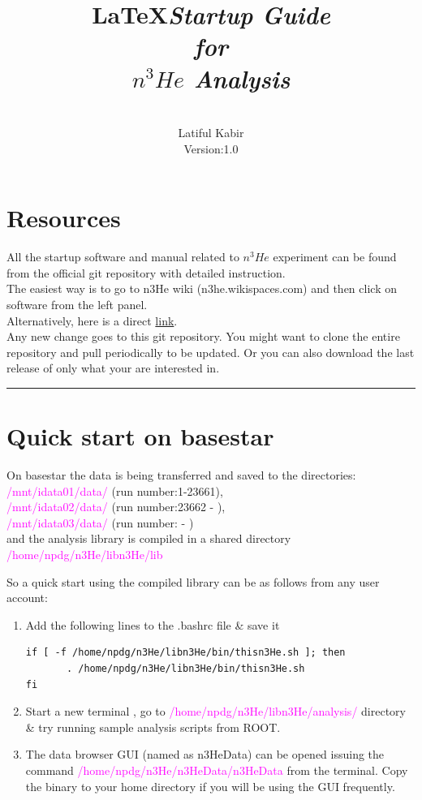 \documentclass[12pt]{article}
\title{\LaTeX}
\date{}
\title{\emph{\huge\textbf{Startup Guide \\ for \\$n^3He$ Analysis}}
}
\author{\\Latiful Kabir\\
Version:1.0
}
\begin{document}
  \maketitle
  
\newpage  
\tableofcontents
\newpage
\setcounter{tocdepth}{2}

\section{Resources}
All the startup software and manual related to $n^3He$ experiment can be found from the official git repository with detailed instruction. \\
The easiest way is to go to n3He wiki (n3he.wikispaces.com) and then click on software from the left panel.  \\
Alternatively, here is a direct \href{http://latifkabir.github.io/n3He_Soft/}{link}.\\
Any new change goes to this  git repository. You might want to clone the entire repository and pull periodically to be updated. Or you can also download the last release of only what your are interested in.  

\noindent
{\color{red} \rule{\linewidth}{1mm} }
 
\newpage
\section{Quick start on basestar}
On basestar the data is being transferred and saved to the directories: \\ \textcolor{magenta}{ /mnt/idata01/data/ } (run number:1-23661),\\ \textcolor{magenta}{ /mnt/idata02/data/ } (run number:23662 - ),\\ \textcolor{magenta}{ /mnt/idata03/data/ } (run number: - )\\and the analysis library is compiled in a shared directory \textcolor{magenta}{ /home/npdg/n3He/libn3He/lib} 

So a quick start using the compiled library can be as follows from any user account:

\begin{enumerate}
  \item Add the following lines to the .bashrc file \& save it
 
\begin{lstlisting}
if [ -f /home/npdg/n3He/libn3He/bin/thisn3He.sh ]; then
       . /home/npdg/n3He/libn3He/bin/thisn3He.sh
fi
\end{lstlisting}

 \item Start a new terminal , go to  \textcolor{magenta} { /home/npdg/n3He/libn3He/analysis/ }directory \& try running sample analysis scripts from ROOT.
 \item The data browser GUI (named as n3HeData) can be opened issuing the command\textcolor{magenta}{ /home/npdg/n3He/n3HeData/n3HeData } from the terminal. Copy the binary to your home directory if you will be using the GUI frequently.
\end{enumerate}
\end{document}
